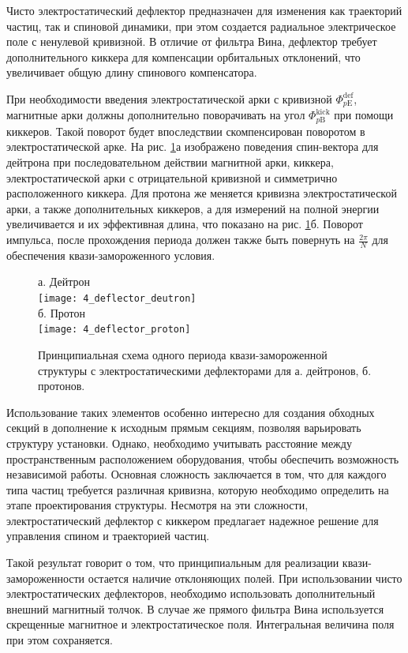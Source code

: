 \par Чисто электростатический дефлектор предназначен для изменения как траекторий частиц, так и спиновой динамики, при этом создается радиальное электрическое поле с ненулевой кривизной. В отличие от фильтра Вина, дефлектор требует дополнительного киккера для компенсации орбитальных отклонений, что увеличивает общую длину спинового компенсатора. 
\par При необходимости введения электростатической арки с кривизной $\Phi_{p\textrm{E}}^{\textrm{def}}$, магнитные арки должны дополнительно поворачивать на угол $\Phi_{p\textrm{B}}^{\textrm{kick}}$ при помощи киккеров. Такой поворот будет впоследствии скомпенсирован поворотом в электростатической арке. На рис. \ref{fig:4_arc_B_E}а изображено поведения спин-вектора для дейтрона при последовательном действии магнитной арки, киккера, электростатической арки с отрицательной кривизной и симметрично расположенного киккера. Для протона же меняется кривизна электростатической арки, а также дополнительных киккеров, а для измерений на полной энергии увеличивается и их эффективная длина, что показано на рис. \ref{fig:4_arc_B_E}б. Поворот импульса, после прохождения периода должен также быть повернуть на $\frac{2\pi}{N}$ для обеспечения квази-замороженного условия.

\begin{figure} [h!]
	\centering
	а. Дейтрон\\
	\texttt{[image: 4\_deflector\_deutron]}\\
	б. Протон\\
	\texttt{[image: 4\_deflector\_proton]}
	\caption{Принципиальная схема одного периода квази-замороженной структуры с электростатическими дефлекторами для а. дейтронов, б. протонов.}
	\label{fig:4_arc_B_E}
\end{figure}

\par Использование таких элементов особенно интересно для создания обходных секций в дополнение к исходным прямым секциям, позволяя варьировать структуру установки. Однако, необходимо учитывать расстояние между пространственным расположением оборудования, чтобы обеспечить возможность независимой работы. Основная сложность заключается в том, что для каждого типа частиц требуется различная кривизна, которую необходимо определить на этапе проектирования структуры. Несмотря на эти сложности, электростатический дефлектор с киккером предлагает надежное решение для управления спином и траекторией частиц.
\newline
\par Такой результат говорит о том, что принципиальным для реализации квази-замороженности остается наличие отклоняющих полей. При использовании чисто электростатических дефлекторов, необходимо использовать дополнительный внешний магнитный толчок. В случае же прямого фильтра Вина используется скрещенные магнитное и электростатическое поля. Интегральная величина поля при этом сохраняется.

